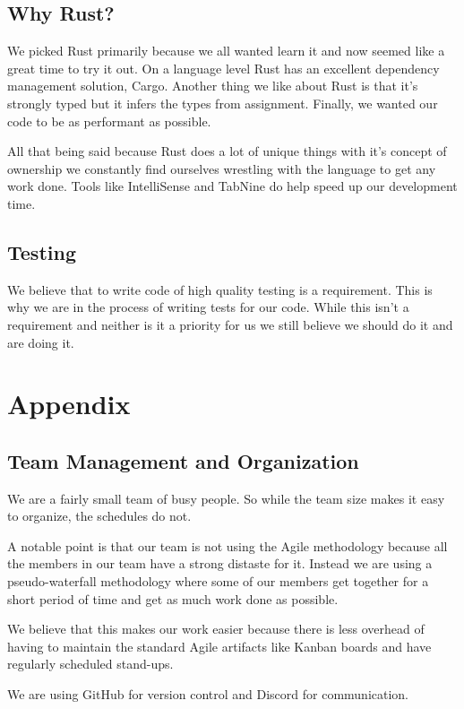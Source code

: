 \documentclass[conference]{IEEEtran}
\begin{document}
\subsection{Why Rust?}

We picked Rust primarily because we all wanted learn it and now seemed like a great time to try it out.
On a language level Rust has an excellent dependency management solution, Cargo.
Another thing we like about Rust is that it's strongly typed but it infers the types from assignment.
Finally, we wanted our code to be as performant as possible.

All that being said because Rust does a lot of unique things with it's concept of ownership we constantly
find ourselves wrestling with the language to get any work done.
Tools like IntelliSense and TabNine do help speed up our development time.

\subsection{Testing}

We believe that to write code of high quality testing is a requirement.
This is why we are in the process of writing tests for our code.
While this isn't a requirement and neither is it a priority for us we still believe we should do it and are doing it.

\section{Appendix}
\subsection{Team Management and Organization}
We are a fairly small team of busy people.
So while the team size makes it easy to organize, the schedules do not.

A notable point is that our team is not using the Agile methodology because
all the members in our team have a strong distaste for it.
Instead we are using a pseudo-waterfall methodology where some of our members get together
for a short period of time and get as much work done as possible.

We believe that this makes our work easier because there is less overhead of having
to maintain the standard Agile artifacts like Kanban boards and have regularly scheduled stand-ups.

We are using GitHub for version control and Discord for communication.
\end{document}
